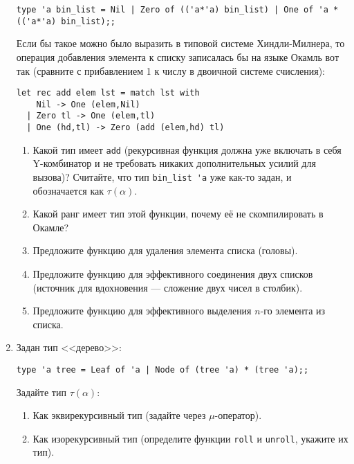 \documentclass[10pt,a4paper,oneside]{article}
\begin{document}
\begin{enumerate}
\begin{verbatim}
type 'a bin_list = Nil | Zero of (('a*'a) bin_list) | One of 'a * (('a*'a) bin_list);;
\end{verbatim}

Если бы такое можно было выразить в типовой системе Хиндли-Милнера, то операция добавления
элемента к списку записалась бы на языке Окамль вот так (сравните с прибавлением 1 к числу
в двоичной системе счисления):

\begin{verbatim}
let rec add elem lst = match lst with
    Nil -> One (elem,Nil)
  | Zero tl -> One (elem,tl)
  | One (hd,tl) -> Zero (add (elem,hd) tl)
\end{verbatim}

\begin{enumerate}
\item Какой тип имеет \verb!add! (рекурсивная функция должна уже включать в себя Y-комбинатор и не
требовать никаких дополнительных усилий для вызова)?
Считайте, что тип \verb!bin_list 'a! уже как-то задан, и обозначается как $\tau(\alpha)$.
\item Какой ранг имеет тип этой функции, почему её не скомпилировать в Окамле?
\item Предложите функцию для удаления элемента списка (головы).
\item Предложите функцию для эффективного соединения двух списков (источник для 
вдохновения --- сложение двух чисел в столбик).
\item Предложите функцию для эффективного выделения $n$-го элемента из списка.
\end{enumerate}

%
%

\item Задан тип <<дерево>>:

\begin{verbatim}
type 'a tree = Leaf of 'a | Node of (tree 'a) * (tree 'a);;
\end{verbatim}

Задайте тип $\tau(\alpha)$:
\begin{enumerate}
\item Как эквирекурсивный тип (задайте через $\mu$-оператор).
\item Как изорекурсивный тип (определите функции \verb!roll! и \verb!unroll!, укажите их тип).
\end{enumerate}

\end{enumerate}
\end{document}
